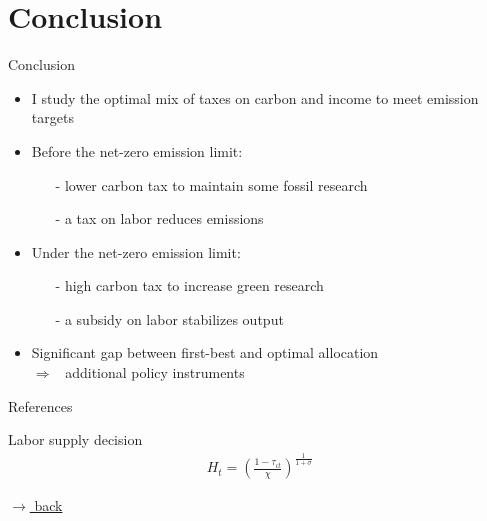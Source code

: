\documentclass[11pt,aspectratio=169]{beamer}
\newcommand{\ar}{$\Rightarrow$ \ }
\begin{document}
\hypertarget{conc}{}
\section{Conclusion}
\begin{frame}{Conclusion}
\begin{itemize}[<+-| alert@+>]
	\item I study the optimal mix of taxes on carbon and income to meet emission targets
	\vspace{3mm}
	
	\item Before the net-zero emission limit: 
	\begin{itemize}
		\item[-]  lower carbon tax to maintain some fossil research
		\item[-] a tax on labor reduces emissions
	\end{itemize}
	\vspace{3mm}
	\item Under the net-zero emission limit: 
	\begin{itemize}
		\item[-] high carbon tax to increase green research
		\item[-]  a subsidy on labor stabilizes output
	\end{itemize}
	\item Significant gap between first-best and optimal allocation\\ \ar additional policy instruments
\end{itemize}
\end{frame}
\begin{frame}[shrink]{References}



\end{frame}



\appendix

\begin{frame}{Labor supply decision}
\hypertarget{labsup}{}
\begin{align*}
	H_t=\left(\frac{1-\tau_{\iota t}}{\chi}\right)^{\frac{1}{1+\sigma}}
\end{align*}

\vfill
\vspace{0mm}
\hfill 
\hyperlink{hhopt}{\tiny{$\rightarrow$ back}}
\end{frame}
\end{document}
